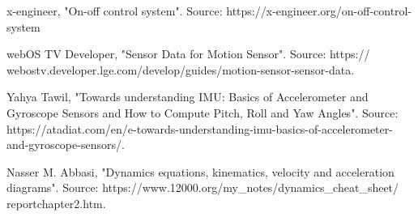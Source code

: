 \begin{thebibliography}{99}
 x-engineer, "On-off control system". Source: https://x-engineer.org/on-off-control- system

 webOS TV Developer, "Sensor Data for Motion Sensor". Source: https:// webostv.developer.lge.com/develop/guides/motion-sensor-sensor-data.

 Yahya Tawil, "Towards understanding IMU: Basics of Accelerometer and Gyroscope Sensors and How to Compute Pitch, Roll and Yaw Angles". Source: https://atadiat.com/en/e-towards-understanding-imu-basics-of-accelerometer-and-gyroscope-sensors/.

 Nasser M. Abbasi, "Dynamics equations, kinematics, velocity and acceleration diagrams". Source: https://www.12000.org/my\_notes/dynamics\_cheat\_sheet/ reportchapter2.htm.

\end{thebibliography}